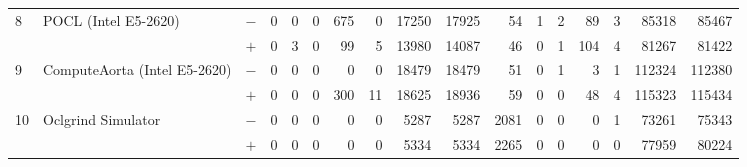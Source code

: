 \begin{tabular}{lll | rrrrrrr | rrrrrrr }
  \hline
  \multirow{ 2}{*}{8} & \multirow{ 2}{*}{POCL (Intel E5-2620)} & $-$ & 0 & 0 & 0 & 675 & 0 & 17250 & 17925 & 54 & 1 & 2 & 89 & 3 & 85318 & 85467 \\& & $+$ & 0 & 3 & 0 & 99 & 5 & 13980 & 14087 & 46 & 0 & 1 & 104 & 4 & 81267 & 81422 \\
  \hline
  \multirow{ 2}{*}{9} & \multirow{ 2}{*}{ComputeAorta (Intel E5-2620)} & $-$ & 0 & 0 & 0 & 0 & 0 & 18479 & 18479 & 51 & 0 & 1 & 3 & 1 & 112324 & 112380 \\& & $+$ & 0 & 0 & 0 & 300 & 11 & 18625 & 18936 & 59 & 0 & 0 & 48 & 4 & 115323 & 115434 \\
  \hline
  \multirow{ 2}{*}{10} & \multirow{ 2}{*}{Oclgrind Simulator} & $-$ & 0 & 0 & 0 & 0 & 0 & 5287 & 5287 & 2081 & 0 & 0 & 0 & 1 & 73261 & 75343 \\& & $+$ & 0 & 0 & 0 & 0 & 0 & 5334 & 5334 & 2265 & 0 & 0 & 0 & 0 & 77959 & 80224 \\


  \bottomrule
\end{tabular}

